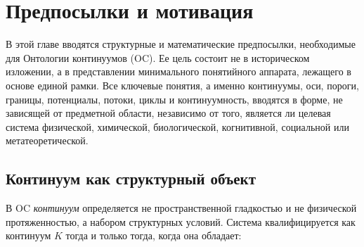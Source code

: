 
\section{Предпосылки и мотивация}
\label{sec:background}

В этой главе вводятся структурные и математические предпосылки, необходимые для Онтологии континуумов (OC).
Ее цель состоит не в историческом изложении, а в представлении минимального понятийного аппарата, лежащего в основе единой рамки.
Все ключевые понятия, а именно континуумы, оси, пороги, границы, потенциалы, потоки, циклы и континуумность, вводятся в форме, не зависящей от предметной области, независимо от того, является ли целевая система физической, химической, биологической, когнитивной, социальной или метатеоретической.

\subsection{Континуум как структурный объект}

В OC \emph{континуум} определяется не пространственной гладкостью и не физической протяженностью, а набором структурных условий.
Система квалифицируется как континуум \(K\) тогда и только тогда, когда она обладает:

